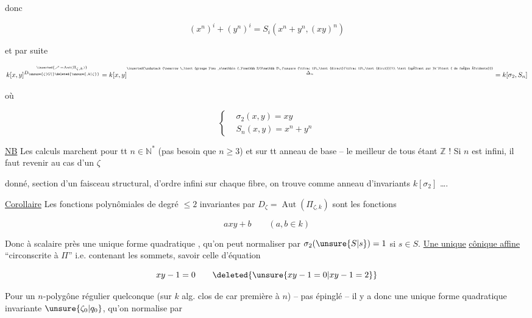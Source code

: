 donc

\[(x^n)^i+(y^n)^i=S_i(x^n+y^n,(xy)^n)\]

et par suite

\[k[x,y]^{\overset{\inserted{\nearrow\,=\operatorname{Aut}(\Pi_{\zeta,k})}}{D_{\unsure{\zeta|G|{}}\deleted{\unsure{,k|\zeta}}}}}
=k[x,y]^{\overset{\inserted{\substack{\nearrow\,\text{groupe }\mu_n\mathbin{.}\mathbb Z/2\mathbb Z\ (\unsure{\tfrac12\,\text{direct}|\tfrac12\,\text{dirct}})\\
\text{opérant sur }k^2\text{ de façon évidente}}}}{\Delta_n}}=k[\sigma_2,S_n]\]

où

\[\left\{\begin{aligned}
&\sigma_2(x,y)=xy\\
&S_n(x,y)=x^n+y^n
\end{aligned}\right.\]

\uline{NB} Les calculs marchent pour tt $n\in\mathbb N^*$ (pas besoin que $n\geq3$) et sur tt anneau de base -- le meilleur de tous étant $\mathbb Z$ ! Si $n$ est infini, il faut revenir au cas d'un $\zeta$


donné, section d'un faisceau structural, d'ordre infini sur chaque fibre, on trouve comme anneau d'invariants $k[\sigma_2]$ \dots.

\uline{Corollaire} Les fonctions polynômiales de degré $\leq2$ invariantes par $D_\zeta=\operatorname{Aut}(\Pi_{\zeta,k})$ sont les fonctions

\[axy+b\qquad (a,b\in k)\]

Donc à scalaire près une unique forme quadratique ,  qu'on peut normaliser par $\sigma_2(\unsure{S|s})=1$ si $s\in S$. \uline{Une unique} \uline{cônique affine} ``circonscrite à $\Pi$'' i.e. contenant les sommets, savoir celle d'équation


\[xy-1=0\qquad\deleted{\unsure{xy-1=0|xy-1=2}}\]


Pour un $n$-polygône régulier quelconque (sur $k$ alg. clos de car première à $n$) -- pas épinglé -- il y a donc  une unique forme quadratique invariante $\unsure{\zeta_0|q_0}$, qu'on normalise par

